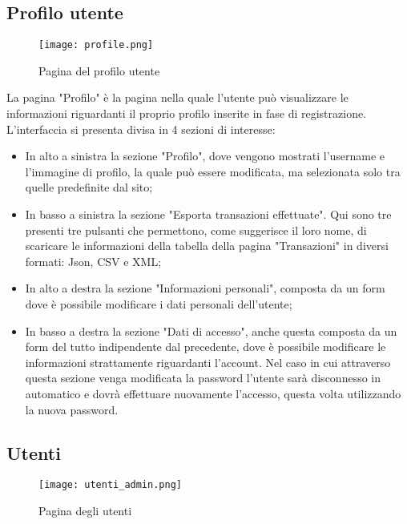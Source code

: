 \documentclass[binding=0.6cm, oneside, noexaminfo, italian]{sapthesis}
\begin{document}
\subsection{Profilo utente}
\begin{figure}[h]
    \centering
    \texttt{[image: profile.png]}
    \caption{Pagina del profilo utente}
    \label{fig:profile}
\end{figure}
La pagina "Profilo" è la pagina nella quale l'utente può visualizzare le informazioni riguardanti il proprio profilo inserite in fase di registrazione. L'interfaccia si presenta divisa in 4 sezioni di interesse:
\begin{itemize}
    \item In alto a sinistra la sezione "Profilo", dove vengono mostrati l'username e l'immagine di profilo, la quale può essere modificata, ma selezionata solo tra quelle predefinite dal sito;
    \item In basso a sinistra la sezione "Esporta transazioni effettuate". Qui sono tre presenti tre pulsanti che permettono, come suggerisce il loro nome, di scaricare le informazioni della tabella della pagina "Transazioni" in diversi formati: Json, CSV e XML;
    \item In alto a destra la sezione "Informazioni personali", composta da un form dove è possibile modificare i dati personali dell'utente;
    \item In basso a destra la sezione "Dati di accesso", anche questa composta da un form del tutto indipendente dal precedente, dove è possibile modificare le informazioni strattamente riguardanti l'account. Nel caso in cui attraverso questa sezione venga modificata la password l'utente sarà disconnesso in automatico e dovrà effettuare nuovamente l'accesso, questa volta utilizzando la nuova password.
\end{itemize}
\subsection{Utenti}
\begin{figure}[h]
    \centering
    \texttt{[image: utenti\_admin.png]}
    \caption{Pagina degli utenti}
    \label{fig:utenti_admin}
\end{figure}
\end{document}
